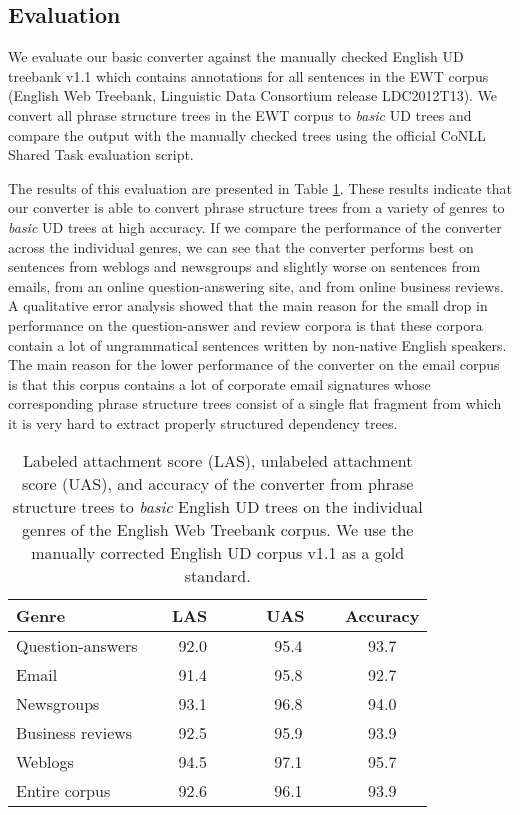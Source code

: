 \documentclass[10pt, a4paper]{article}
\begin{document}
\subsection{Evaluation}

We evaluate our basic converter against the manually checked English UD treebank v1.1 
\cite{UD} which contains annotations for all sentences in the EWT corpus (English
Web Treebank, Linguistic Data Consortium release LDC2012T13). We convert all 
phrase structure trees in the EWT corpus to \textit{basic} UD trees and compare 
the output with the manually checked trees using the official CoNLL Shared Task 
evaluation script. 

The results of this evaluation are presented in Table \ref{tbl:results}.
These results indicate that our converter is able to convert phrase structure trees from a variety of genres
 to \textit{basic} UD trees at high accuracy. If we compare the performance of the converter across 
the individual genres, we can see that the converter performs best on sentences from 
weblogs and newsgroups and slightly worse on sentences from emails, from an online 
question-answering site, and from online business reviews. A qualitative error analysis showed 
that the main reason for the small drop in performance on the question-answer and review corpora 
is that these corpora contain a lot of ungrammatical sentences written by non-native English speakers.
The main reason for the lower performance of the converter on the email corpus is that 
this corpus contains a lot of corporate email signatures whose corresponding 
phrase structure trees consist of a single flat fragment from which it is very hard to extract properly
structured dependency trees. 

\begin{table}
\begin{center}
\begin{tabularx}{\columnwidth}{ l | c | c | c}
\toprule
\textbf{Genre} & \textbf{\ \ LAS \  \ } & \textbf{ \ \ UAS \ \ } & \textbf{Accuracy} \tabularnewline
\midrule
Question-answers & 92.0 &  95.4 & 93.7 \tabularnewline
Email & 91.4 & 95.8 & 92.7 \tabularnewline
Newsgroups & 93.1 & 96.8 & 94.0 \tabularnewline
Business reviews & 92.5 & 95.9 & 93.9 \tabularnewline
Weblogs & 94.5 & 97.1 & 95.7 \tabularnewline
\midrule
Entire corpus & 92.6 & 96.1 & 93.9 \tabularnewline
\bottomrule
\end{tabularx}
\end{center}
\caption{\label{tbl:results}  Labeled attachment 
score (LAS), unlabeled attachment score (UAS), and accuracy of the converter from phrase structure trees to \textit{basic} 
English UD trees on the individual genres of the English Web Treebank corpus. 
We use the manually corrected English UD corpus v1.1 \cite{UD} as a gold standard.
}



\end{table}
\end{document}

